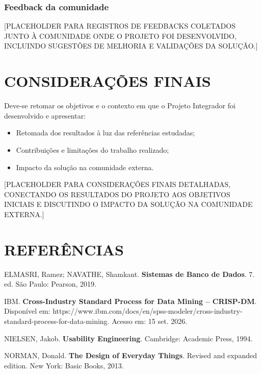 \documentclass[12pt,a4paper]{article}
\begin{document}
\subsubsection{Feedback da comunidade}
[PLACEHOLDER PARA REGISTROS DE FEEDBACKS COLETADOS JUNTO À COMUNIDADE ONDE O PROJETO FOI DESENVOLVIDO, INCLUINDO SUGESTÕES DE MELHORIA E VALIDAÇÕES DA SOLUÇÃO.]

\newpage
\section{CONSIDERAÇÕES FINAIS}

Deve-se retomar os objetivos e o contexto em que o Projeto Integrador foi desenvolvido e apresentar:

\begin{itemize}
\item Retomada dos resultados à luz das referências estudadas;
\item Contribuições e limitações do trabalho realizado;
\item Impacto da solução na comunidade externa.
\end{itemize}

[PLACEHOLDER PARA CONSIDERAÇÕES FINAIS DETALHADAS, CONECTANDO OS RESULTADOS DO PROJETO AOS OBJETIVOS INICIAIS E DISCUTINDO O IMPACTO DA SOLUÇÃO NA COMUNIDADE EXTERNA.]

\newpage
\section{REFERÊNCIAS}
\linespread{1}\selectfont\setlength{\baselineskip}{12pt}

ELMASRI, Ramez; NAVATHE, Shamkant. 
{\bfseries Sistemas de Banco de Dados}.
7. ed. São Paulo: Pearson, 2019. 

\bigskip

IBM. 
{\bfseries Cross-Industry Standard Process for Data Mining – CRISP-DM}. 
Disponível em: https://www.ibm.com/docs/en/spss-modeler/cross-industry-standard-process-for-data-mining. Acesso em: 15 set. 2026. 

\bigskip

NIELSEN, Jakob. 
{\bfseries Usability Engineering}. 
Cambridge: Academic Press, 1994. 

\bigskip

NORMAN, Donald. 
{\bfseries The Design of Everyday Things}. 
Revised and expanded edition. New York: Basic Books, 2013. 

\bigskip
\end{document}
